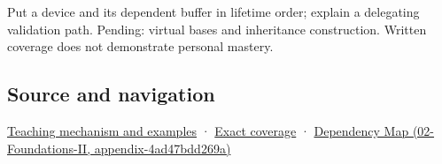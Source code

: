 Put a device and its dependent buffer in lifetime order; explain a delegating validation path. Pending: virtual bases and inheritance construction. Written coverage does not demonstrate personal mastery.

\subsection{Source and navigation}\label{source-and-navigation}

\href{Continuous\%20Notes/Computing\%20Foundations\%20-\%20From\%20Bits\%20to\%20C++\%20and\%20Systems\%20APIs\#Construction\%20order\%20records\%20lifetime\%20dependencies}{Teaching mechanism and examples} · \hyperref[appendix-fd090d982a15]{Exact coverage} · \href{}{Dependency Map (02-Foundations-II, appendix-4ad47bdd269a)}

